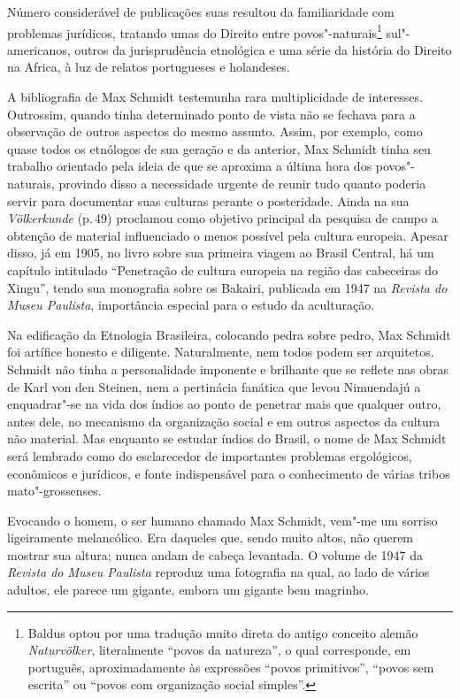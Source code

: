 Número considerável de publicações suas resultou da familiaridade com
problemas jurídicos, tratando umas do Direito entre
povos"-naturais\footnote{Baldus optou por uma tradução muito direta do
  antigo conceito alemão \textit{Naturvölker}, literalmente ``povos da
  natureza'', o qual corresponde, em português, aproximadamente às
  expressões ``povos primitivos'', ``povos sem escrita'' ou ``povos com
  organização social simples''.} sul"-americanos, outros da jurisprudência
etnológica e uma série da história do Direito na Africa, à luz de
relatos portugueses e holandeses.

A bibliografia de Max Schmidt testemunha rara multiplicidade de
interesses. Outrossim, quando tinha determinado ponto de vista não se
fechava para a observação de outros aspectos do mesmo assunto. Assim,
por exemplo, como quase todos os etnólogos de sua geração e da anterior,
Max Schmidt tinha seu trabalho orientado pela ideia de que se aproxima a
última hora dos povos"-naturais, provindo disso a necessidade urgente de
reunir tudo quanto poderia servir para documentar suas culturas perante
o posteridade. Ainda na sua \textit{Völkerkunde} (p.\,49) proclamou como
objetivo principal da pesquisa de campo a obtenção de material
influenciado o menos possível pela cultura europeia. Apesar disso, já em
1905, no livro sobre sua primeira viagem ao Brasil Central, há um
capítulo intitulado ``Penetração de cultura europeia na região das
cabeceiras do Xingu'', tendo sua monografia sobre os Bakairi, publicada
em 1947 na \textit{Revista do Museu Paulista}, importância especial para o
estudo da aculturação.

Na edificação da Etnologia Brasileira, colocando pedra sobre pedro, Max
Schmidt foi artífice honesto e diligente. Naturalmente, nem todos podem
ser arquitetos. Schmidt não tinha a personalidade imponente e brilhante
que se reflete nas obras de Karl von den Steinen, nem a pertinácia
fanática que levou Nimuendajú a enquadrar"-se na vida dos índios ao ponto
de penetrar mais que qualquer outro, antes dele, no mecanismo da
organização social e em outros aspectos da cultura não material. Mas
enquanto se estudar índios do Brasil, o nome de Max Schmidt será
lembrado como do esclarecedor de importantes problemas ergológicos,
econômicos e jurídicos, e fonte indispensável para o conhecimento de
várias tribos mato"-grossenses.


Evocando o homem, o ser humano chamado Max Schmidt, vem"-me um sorriso
ligeiramente melancólico. Era daqueles que, sendo muito altos, não
querem mostrar sua altura; nunca andam de cabeça levantada. O volume de
1947 da \textit{Revista do Museu Paulista} reproduz uma fotografia na
qual, ao lado de vários adultos, ele parece um gigante, embora um
gigante bem magrinho.

